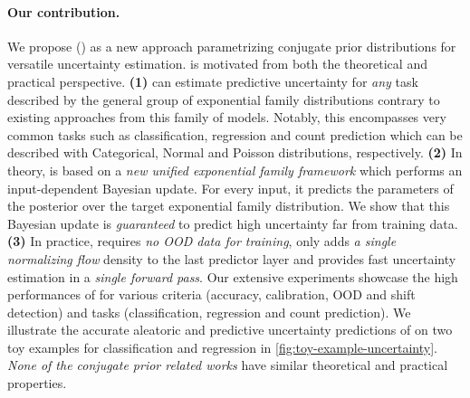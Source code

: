 \paragraph{Our contribution.} We propose \NatPN{} (\NatPNacro{}) as a new approach parametrizing conjugate prior distributions for versatile uncertainty estimation. \NatPNacro{}{} is motivated from both the theoretical and practical perspective. 
\textbf{(1)} \NatPNacro{} can estimate predictive uncertainty for \emph{any} task described by the general group of exponential family distributions contrary to existing approaches from this family of models. Notably, this encompasses very common tasks such as classification, regression and count prediction which can be described with Categorical, Normal and Poisson distributions, respectively. 
\textbf{(2)} In theory, \NatPNacro{} is based on a \emph{new unified exponential family framework} which performs an input-dependent Bayesian update. For every input, it predicts the parameters of the posterior over the target exponential family distribution. We show that this Bayesian update is \emph{guaranteed} to predict high uncertainty far from training data.
\textbf{(3)} In practice, \NatPNacro{} requires \emph{no OOD data for training}, only adds \emph{a single normalizing flow} density to the last predictor layer and provides fast uncertainty estimation in a \emph{single forward pass}. Our extensive experiments showcase the high performances of \NatPNacro{} for various criteria (accuracy, calibration, OOD and shift detection) and tasks (classification, regression and count prediction). We illustrate the accurate aleatoric and predictive uncertainty predictions of \NatPNacro{} on two toy examples for classification and regression in \cref{fig:toy-example-uncertainty}. \emph{None of the conjugate prior related works} have similar theoretical and practical properties.

